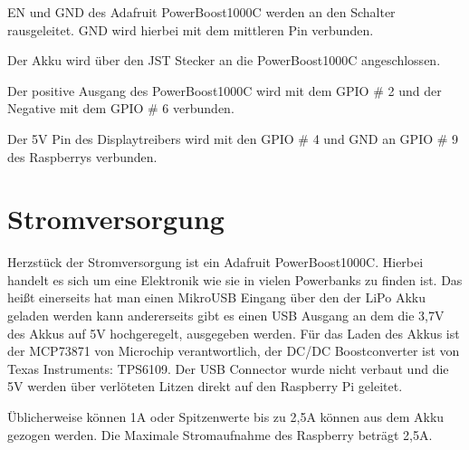 EN und GND des Adafruit PowerBoost1000C werden an den Schalter rausgeleitet. GND wird hierbei mit dem mittleren Pin verbunden. 

Der Akku wird über den JST Stecker an die PowerBoost1000C angeschlossen. 

Der positive Ausgang des PowerBoost1000C wird mit dem GPIO \# 2 und der Negative mit dem GPIO \# 6 verbunden. 

Der 5V Pin des Displaytreibers wird mit den GPIO \# 4 und GND an GPIO \# 9 des Raspberrys verbunden. 

\section{Stromversorgung}

Herzstück der Stromversorgung ist ein Adafruit PowerBoost1000C. Hierbei handelt es sich um eine Elektronik wie sie in vielen Powerbanks zu finden ist. Das heißt einerseits hat man einen MikroUSB Eingang über den der LiPo Akku geladen werden kann andererseits gibt es einen USB Ausgang an dem die 3,7V des Akkus auf 5V hochgeregelt, ausgegeben werden. Für das Laden des Akkus ist der MCP73871 von Microchip verantwortlich, der DC/DC Boostconverter ist von Texas Instruments: TPS6109. Der USB Connector wurde nicht verbaut und die 5V werden über verlöteten Litzen direkt auf den Raspberry Pi geleitet. 

Üblicherweise können 1A oder Spitzenwerte bis zu 2,5A können aus dem Akku gezogen werden. Die Maximale Stromaufnahme des Raspberry beträgt 2,5A.  
